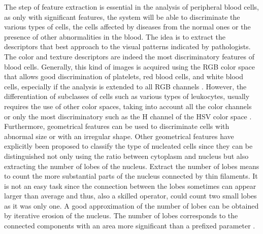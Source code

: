 The step of feature extraction is essential in the analysis of peripheral blood cells, as only with significant features, the system will be able to discriminate the various types of cells, the cells affected by diseases from the normal ones or the presence of other abnormalities in the blood. The idea is to extract the descriptors that best approach to the visual patterns indicated by pathologists. The color and texture descriptors are indeed the most discriminatory features of blood cells. Generally, this kind of images is acquired using the RGB color space that allows good discrimination of platelets, red blood cells, and white blood cells, especially if the analysis is extended to all RGB channels \cite{Angulo}. However, the differentiation of subclasses of cells such as various types of leukocytes, usually requires the use of other color spaces, taking into account all the color channels or only the most discriminatory such as the H channel of the HSV color space \cite{Hengen}.
Furthermore, geometrical features can be used to discriminate cells with abnormal size or with an irregular shape. Other geometrical features have explicitly been proposed to classify the type of nucleated cells since they can be distinguished not only using the ratio between cytoplasm and nucleus \cite{Piuri, Sco05, Sco06} but also extracting the number of lobes of the nucleus. Extract the number of lobes means to count the more substantial parts of the nucleus connected by thin filaments. It is not an easy task since the connection between the lobes sometimes can appear larger than average and thus, also a skilled operator, could count two small lobes as it was only one. A good approximation of the number of lobes can be obtained by iterative erosion of the nucleus. The number of lobes corresponds to the connected components with an area more significant than a prefixed parameter \cite{Piuri}.  

